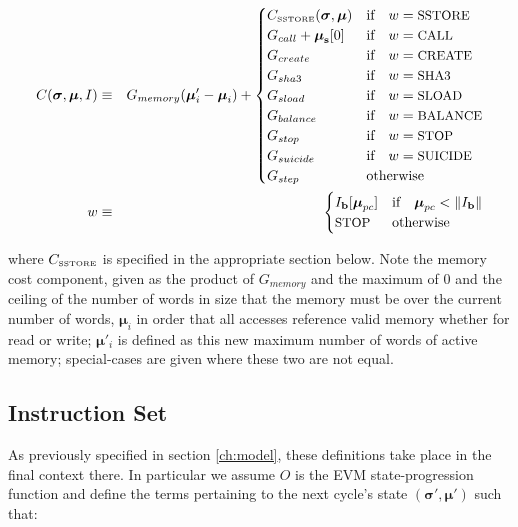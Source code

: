 \documentclass[9pt,oneside]{amsart}
\begin{document}
\begin{eqnarray}
C(\boldsymbol{\sigma}, \boldsymbol{\mu}, I) & \equiv & G_{memory}(\boldsymbol{\mu}'_i - \boldsymbol{\mu}_i) + \begin{cases}
C_\text{\tiny SSTORE}(\boldsymbol{\sigma}, \boldsymbol{\mu}) & \text{if} \quad w = \text{\small SSTORE} \\
G_{call} + \boldsymbol{\mu}_\mathbf{s}[0] & \text{if} \quad w = \text{\small CALL}\\
G_{create} & \text{if} \quad w = \text{\small CREATE}\\
G_{sha3} & \text{if} \quad w = \text{\small SHA3}\\
G_{sload} & \text{if} \quad w = \text{\small SLOAD}\\
G_{balance} & \text{if} \quad w = \text{\small BALANCE}\\
G_{stop} & \text{if} \quad w = \text{\small STOP}\\
G_{suicide} & \text{if} \quad w = \text{\small SUICIDE}\\
G_{step} & \text{otherwise}
\end{cases} \\
w & \equiv & \begin{cases} I_\mathbf{b}[\boldsymbol{\mu}_{pc}] & \text{if} \quad \boldsymbol{\mu}_{pc} < \lVert I_\mathbf{b} \rVert \\
\text{\small STOP} & \text{otherwise}
\end{cases}
\end{eqnarray}

where $C_\text{\tiny SSTORE}$ is specified in the appropriate section below. Note the memory cost component, given as the product of $G_{memory}$ and the maximum of 0 and the ceiling of the number of words in size that the memory must be over the current number of words, $\boldsymbol{\mu}_i$ in order that all accesses reference valid memory whether for read or write; $\boldsymbol{\mu}'_i$ is defined as this new maximum number of words of active memory; special-cases are given where these two are not equal.

\subsection{Instruction Set}

As previously specified in section \ref{ch:model}, these definitions take place in the final context there. In particular we assume $O$ is the EVM state-progression function and define the terms pertaining to the next cycle's state $(\boldsymbol{\sigma}', \boldsymbol{\mu}')$ such that:
\end{document}
